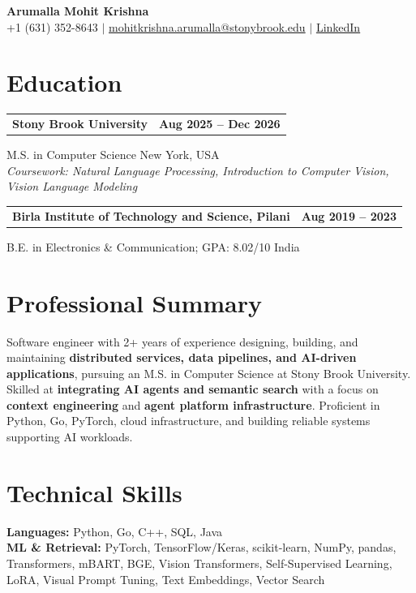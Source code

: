 \documentclass[letterpaper,10pt]{article}
\makeatletter
\newcommand{\entry}[2]{%
  \noindent
  \begin{tabularx}{\linewidth}
    {@{}>{\raggedright\arraybackslash}X@{\hspace{6pt}}r@{}}
    \textbf{#1} & #2
  \end{tabularx}\par
}
\makeatother
\begin{document}
\begin{center}
    {\LARGE\bfseries Arumalla Mohit Krishna}\\[3pt]
    +1 (631) 352-8643 $|$
    \href{mailto:mohitkrishna.arumalla@stonybrook.edu}
    {mohitkrishna.arumalla@stonybrook.edu} $|$
    \href{https://linkedin.com/in/mohit-krishna-arumalla}
    {LinkedIn}
\end{center}
\vspace{-8pt}

\section{Education}

\entry
  {\textbf{Stony Brook University}}
  {\textbf{Aug 2025 -- Dec 2026}}

M.S. in Computer Science \hfill New York, USA\\
\textit{
Coursework: Natural Language Processing,
Introduction to Computer Vision, Vision Language Modeling
}
\vspace{3pt}

\entry
  {\textbf{Birla Institute of Technology and Science, Pilani}}
  {\textbf{Aug 2019 -- 2023}}

B.E. in Electronics \& Communication; GPA: 8.02/10 \hfill India
\section{Professional Summary}

Software engineer with 2+ years of experience designing, building, and maintaining \textbf{distributed services, data pipelines, and AI-driven applications}, pursuing an M.S. in Computer Science at Stony Brook University. Skilled at \textbf{integrating AI agents and semantic search} with a focus on \textbf{context engineering} and \textbf{agent platform infrastructure}. Proficient in Python, Go, PyTorch, cloud infrastructure, and building reliable systems supporting AI workloads.
\section{Technical Skills}

\textbf{Languages:}
Python, Go, C++, SQL, Java\\

\textbf{ML \& Retrieval:}
PyTorch, TensorFlow/Keras, scikit-learn, NumPy, pandas,
Transformers, mBART, BGE, Vision Transformers,
Self-Supervised Learning, LoRA, Visual Prompt Tuning,
Text Embeddings, Vector Search\\
\end{document}
